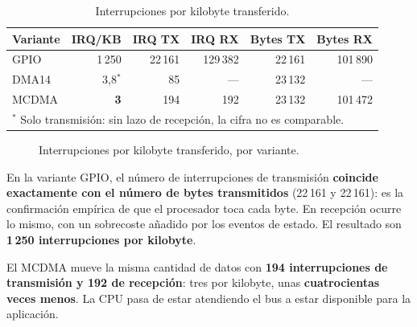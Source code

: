 \begin{table}[H]
    \centering
    \begin{tabular}{lrrrrr}
        \hline
        \textbf{Variante} & \textbf{IRQ/KB} & \textbf{IRQ TX} & \textbf{IRQ RX} & \textbf{Bytes TX} & \textbf{Bytes RX} \\
        \hline
        GPIO  & 1\,250 & 22\,161 & 129\,382 & 22\,161 & 101\,890 \\
        DMA14 & 3,8$^{*}$ & 85 & --- & 23\,132 & --- \\
        MCDMA & \textbf{3} & 194 & 192 & 23\,132 & 101\,472 \\
        \hline
        \multicolumn{6}{l}{\footnotesize $^{*}$ Solo transmisión: sin lazo de recepción, la cifra no es comparable.} \\
    \end{tabular}
    \caption{Interrupciones por kilobyte transferido.}
    \label{tab:bench_irq}
\end{table}

\begin{figure}[htbp]
    \centering
    \caption{Interrupciones por kilobyte transferido, por variante.}
    \label{fig:bench_irq}
\end{figure}

En la variante GPIO, el número de interrupciones de transmisión
\textbf{coincide exactamente con el número de bytes transmitidos} (22\,161 y 22\,161): es la
confirmación empírica de que el procesador toca cada byte. En recepción ocurre lo mismo, con un
sobrecoste añadido por los eventos de estado. El resultado son \textbf{1\,250 interrupciones por
kilobyte}.

El MCDMA mueve la misma cantidad de datos con \textbf{194 interrupciones de transmisión y 192 de
recepción}: tres por kilobyte, unas \textbf{cuatrocientas veces menos}. La CPU pasa de estar
atendiendo el bus a estar disponible para la aplicación.


